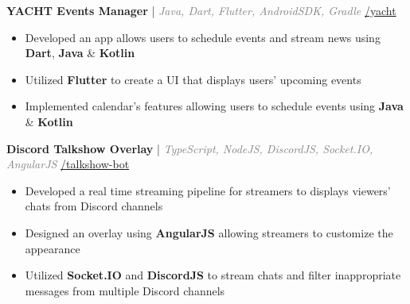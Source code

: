\documentclass[11pt]{article}
\begin{document}

\hspace{10pt}\textbf{YACHT Events Manager} {\small | \textit{\textcolor{gray}{Java, Dart, Flutter, AndroidSDK, Gradle}}} \hfill {\small \href{https://github.com/huynd2001/yacht}{\faGithub{}/yacht}}
  \begin{itemize}[leftmargin=31pt]
  \vspace{-10pt}
    \setlength\itemsep{-5pt}
      \item {\small Developed an app allows users to schedule events and stream news using \textbf{Dart}, \textbf{Java} \& \textbf{Kotlin}}
      \item {\small Utilized \textbf{Flutter} to create a UI that displays users' upcoming events}
      \item {\small Implemented calendar's features allowing users to schedule events using \textbf{Java} \& \textbf{Kotlin}}
      \vspace{-5pt}
  \end{itemize}
 
  \hspace{10pt}\textbf{Discord Talkshow Overlay} {\small | \textit{\textcolor{gray}{TypeScript, NodeJS, DiscordJS, Socket.IO, AngularJS}}} \hfill {\small \href{https://github.com/huynd2001/talkshow-bot}{\faGithub{}/talkshow-bot}}
  \begin{itemize}[leftmargin=31pt]
  \vspace{-10pt}
    \setlength\itemsep{-5pt}
      \item {\small Developed a real time streaming pipeline for streamers to displays viewers' chats from Discord channels}
      \item {\small Designed an overlay using \textbf{AngularJS} allowing streamers to customize the appearance}
      \item {\small Utilized \textbf{Socket.IO} and \textbf{DiscordJS} to stream chats and filter inappropriate messages from multiple Discord channels}
      \vspace{-5pt}
  \end{itemize}
\end{document}
